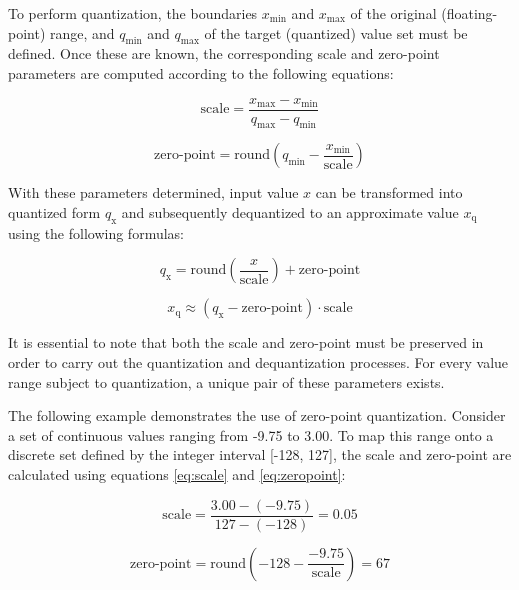 {To perform quantization, the boundaries \( x_{\text{min}} \) and \( x_{\text{max}} \) of the original (floating-point) range, and \( q_{\text{min}} \) and \( q_{\text{max}} \) of the target (quantized) value set must be defined. Once these are known, the corresponding scale and zero-point parameters are computed according to the following equations:

\begin{equation}
\text{scale} = \frac{x_{\text{max}} - x_{\text{min}}}{q_{\text{max}} - q_{\text{min}}}
\label{eq:scale}
\end{equation}

\begin{equation}
\text{zero-point} = \text{round}\left( q_{\text{min}} - \frac{x_{\text{min}}}{\text{scale}} \right)
\label{eq:zeropoint}
\end{equation}

With these parameters determined, input value \( x \) can be transformed into quantized form \( q_{\text{x}} \) and subsequently dequantized to an approximate value \( x_{\text{q}} \) using the following formulas:

\begin{equation}
q_{\text{x}} = \text{round}\left(\frac{x}{\text{scale}} \right) + \text{zero-point}
\label{eq:quantize}
\end{equation}

\begin{equation}
x_{\text{q}} \approx \left( q_{\text{x}} - \text{zero-point} \right) \cdot \text{scale}
\label{eq:dequantize}
\end{equation}

It is essential to note that both the scale and zero-point must be preserved in order to carry out the quantization and dequantization processes. For every value range subject to quantization, a unique pair of these parameters exists.

The following example demonstrates the use of zero-point quantization. Consider a set of continuous values ranging from -9.75 to 3.00. To map this range onto a discrete set defined by the integer interval [-128, 127], the scale and zero-point are calculated using equations \ref{eq:scale} and \ref{eq:zeropoint}:

\begin{equation*}
\text{scale} = \frac{3.00 - (-9.75)}{127 - (-128)} = 0.05
\end{equation*}

\begin{equation*}
\text{zero-point} = \text{round}\left( -128 - \frac{-9.75}{\text{scale}} \right) = 67
\end{equation*}


}
